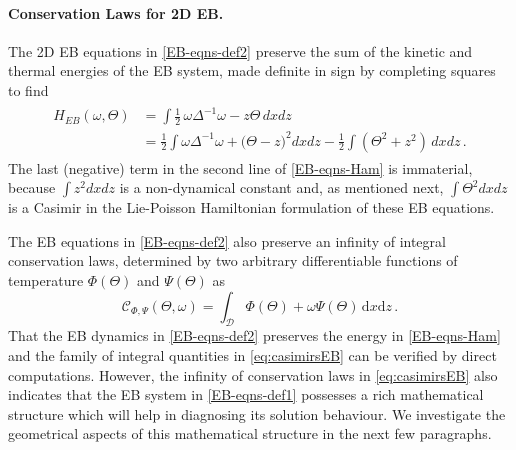 \documentclass[11pt, oneside]{article}   	%
\numberwithin{equation}{section}
\theoremstyle{plain}
\theoremstyle{definition}
\theoremstyle{remark}
\newcommand{\<}{\langle}
\renewcommand{\>}{\rangle}
\newcommand{\mc}[1]{\mathcal{#1}}
\begin{document}
\paragraph{Conservation Laws for 2D EB.}
The 2D EB equations in \eqref{EB-eqns-def2} preserve the sum of the kinetic and thermal energies of the EB system, made definite in sign by completing squares to find
\begin{align}
\begin{split}
H_{EB}(\omega,\Theta) 
&= \int  \frac12\,  \omega \Delta^{-1}\omega - z \Theta \,dxdz
\\&= \frac12 \int  \omega \Delta^{-1}\omega + \big(\Theta -   z\big)^2  dxdz
- \frac12\int(\Theta^2 +  z^2) \,dxdz
\,.
\end{split}
\label{EB-eqns-Ham}
\end{align}
%
The last (negative) term in the second line of \eqref{EB-eqns-Ham} is immaterial, because $\int z^2dxdz$ is a non-dynamical constant and, as mentioned next, $\int{\Theta}^2dxdz$ is a Casimir in the Lie-Poisson Hamiltonian formulation of these EB equations.

The EB equations in \eqref{EB-eqns-def2} also preserve an infinity of integral conservation laws, determined by two arbitrary differentiable functions of temperature $\Phi(\Theta)$ and $\Psi(\Theta)$ as
\begin{equation}
\mc{C}_{\Phi,\Psi}(\Theta,\omega) = \int_{\mathcal D}\Phi(\Theta ) + \omega \Psi(\Theta )\,\mathrm{d}x\mathrm{d}z\,.
\label{eq:casimirsEB}
\end{equation}
That the EB dynamics in \eqref{EB-eqns-def2} preserves the energy in \eqref{EB-eqns-Ham} and the family of integral quantities in \eqref{eq:casimirsEB} can be verified by direct computations. However, the infinity of conservation laws in \eqref{eq:casimirsEB} also indicates that the EB system in \eqref{EB-eqns-def1} possesses a rich mathematical structure which will help in diagnosing its solution behaviour. We investigate the geometrical aspects of this mathematical structure in the next few paragraphs.
\end{document}
